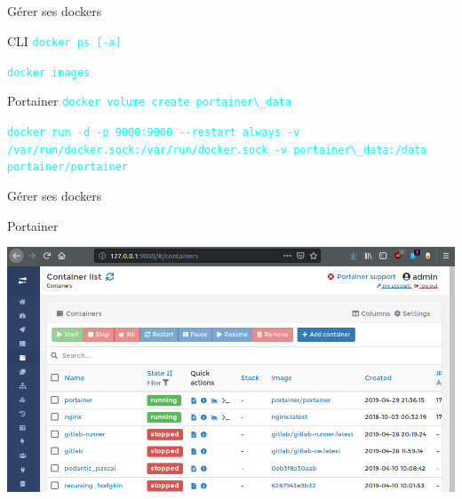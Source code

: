\documentclass{beamer}
\begin{document}
\subsection{}

\begin{frame}[fragile]{Gérer ses dockers}
\begin{block}{CLI}
\textcolor{cyan}{\verb?docker ps [-a]?}

\textcolor{cyan}{\verb?docker images?}
\end{block}

\begin{block}{Portainer}
\textcolor{cyan}{\verb?docker volume create portainer\_data?}

\textcolor{cyan}{\verb?docker run -d -p 9000:9000 --restart always -v /var/run/docker.sock:/var/run/docker.sock -v portainer\_data:/data portainer/portainer?}
\end{block}
\end{frame}


\begin{frame}[fragile]{Gérer ses dockers}
\begin{block}{Portainer}
\begin{center}
\includegraphics[width=1.0\linewidth]{images/portainer}
\end{center}
\end{block}
\end{frame}

\end{document}
